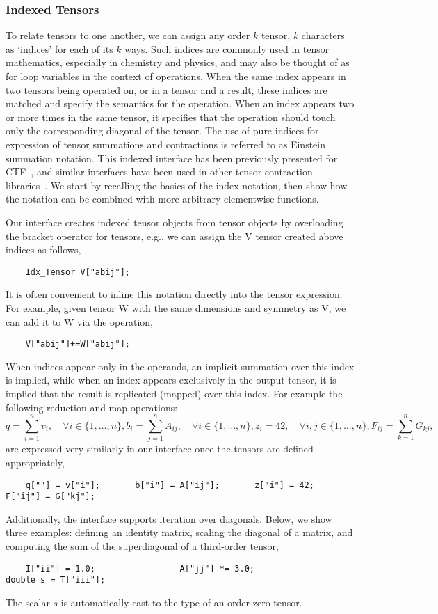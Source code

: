 \subsubsection{Indexed Tensors}

To relate tensors to one another, we can assign any order $k$ tensor, $k$ characters as `indices' for each of its $k$ ways.
Such indices are commonly used in tensor mathematics, especially in chemistry and physics, and may also be thought of as for loop variables in the context of operations.
When the same index appears in two tensors being operated on, or in a tensor and a result, these indices are matched and specify the semantics for the operation.
When an index appears two or more times in the same tensor, it specifies that the operation should touch only the corresponding diagonal of the tensor.
The use of pure indices for expression of tensor summations and contractions is referred to as Einstein summation notation.
This indexed interface has been previously presented for CTF~\cite{solomonik2014massively}, and similar interfaces have been used in other tensor contraction libraries~\cite{JCC:JCC23377}.
We start by recalling the basics of the index notation, then show how the notation can be combined with more arbitrary elementwise functions.

Our interface creates indexed tensor objects from tensor objects by overloading the bracket operator for tensors, e.g., we can assign the {\CD V} tensor created above indices as follows,
\begin{lstlisting}
    Idx_Tensor V["abij"];
\end{lstlisting}
It is often convenient to inline this notation directly into the tensor expression.
For example, given tensor {\CD W} with the same dimensions and symmetry as {\CD V}, we can add it to {\CD W} via the operation,
\begin{lstlisting}
    V["abij"]+=W["abij"];
\end{lstlisting}
When indices appear only in the operands, an implicit summation over this index is implied, while when an index appears exclusively in the output tensor, it is implied that the result is replicated (mapped) over this index.
For example the following reduction and map operations:
\[q = \sum_{i=1}^n v_i, \quad 
 \forall i\in\{1,\ldots, n\}, b_{i} = \sum_{j=1}^n A_{ij}, \quad
 \forall i \in \{1,\ldots, n\}, z_i = 42, \quad 
 \forall i,j\in\{1,\ldots, n\}, F_{ij} = \sum_{k=1}^n G_{kj},\]
are expressed very similarly in our interface once the tensors are defined appropriately,
\begin{lstlisting}
    q[""] = v["i"];       b["i"] = A["ij"];       z["i"] = 42;       F["ij"] = G["kj"];
\end{lstlisting}
Additionally, the interface supports iteration over diagonals.
Below, we show three examples: defining an identity matrix, scaling the diagonal of a matrix, and computing the sum of the superdiagonal of a third-order tensor,
\begin{lstlisting}
    I["ii"] = 1.0;                 A["jj"] *= 3.0;                 double s = T["iii"];
\end{lstlisting}
The scalar $s$ is automatically cast to the type of an order-zero tensor.

